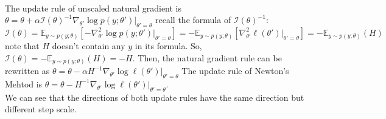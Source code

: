 \begin{answer}\\
The update rule of unscaled natural gradient is $\theta =\theta + \alpha \mathcal{I}(\theta)^{-1} \nabla_{\theta'}\log p(y; \theta')|_{\theta'=\theta}$
recall the formula of $\mathcal{I}(\theta)^{-1}$:
$$\mathcal{I}(\theta) = \mathbb{E}_{y\sim p(y;\theta)}[-\nabla^2_{\theta'} \log p(y;\theta')|_{\theta'=\theta}] = -\mathbb{E}_{y\sim p(y;\theta)}[\nabla^2_{\theta'} \ell(\theta')|_{\theta'=\theta}] = -\mathbb{E}_{y\sim p(y;\theta)}(H)$$
note that $H$ doesn't contain any $y$ in its formula. So, $\mathcal{I}(\theta) = -\mathbb{E}_{y\sim p(y;\theta)}(H) = -H$. Then, the natural gradient rule can be rewritten as $\theta =\theta - \alpha H^{-1} \nabla_{\theta'}\log \ell( \theta')|_{\theta'=\theta}$
The update rule of Newton's Mehtod is $\theta =\theta - H^{-1} \nabla_{\theta'}\log \ell( \theta')|_{\theta'=\theta}$.\\
We can see that the directions of both update rules have the same direction but different step scale.
\end{answer}
